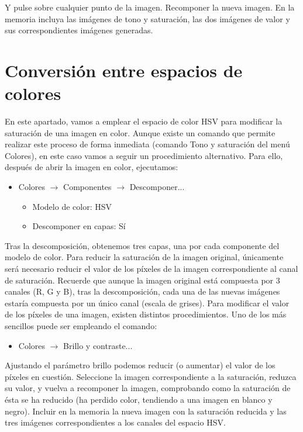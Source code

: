 \documentclass[es,practica]{uah}
\begin{document}
Y pulse sobre cualquier punto de la imagen. Recomponer la nueva imagen. En la memoria incluya las imágenes de tono y saturación, las dos imágenes de valor y sus correspondientes imágenes generadas.

\section{Conversión entre espacios de colores}

En este apartado, vamos a emplear el espacio de color HSV para modificar la saturación de una imagen en color. Aunque existe un comando que permite realizar este proceso de forma inmediata (comando Tono y saturación del menú Colores), en este caso vamos a seguir un procedimiento alternativo. Para ello, después de abrir la imagen en color, ejecutamos:
\begin{itemize}
	\item Colores $\rightarrow$ Componentes $\rightarrow$ Descomponer...
	\begin{itemize}
		\item Modelo de color: HSV
		\item Descomponer en capas: Sí
	\end{itemize}
\end{itemize}

Tras la descomposición, obtenemos tres capas, una por cada componente del modelo de color. Para reducir la saturación de la imagen original, únicamente será necesario reducir el valor de los píxeles de la imagen correspondiente al canal de saturación. Recuerde que aunque la imagen original está compuesta por 3 canales (R, G y B), tras la descomposición, cada una de las nuevas imágenes estaría compuesta por un único canal (escala de grises). Para modificar el valor de los píxeles de una imagen, existen distintos procedimientos. Uno de los más sencillos puede ser empleando el comando:
\begin{itemize}
	\item Colores $\rightarrow$ Brillo y contraste...
\end{itemize}

Ajustando el parámetro brillo podemos reducir (o aumentar) el valor de los píxeles en cuestión. Seleccione la imagen correspondiente a la saturación, reduzca su valor, y vuelva a recomponer la imagen, comprobando como la saturación de ésta se ha reducido (ha perdido color, tendiendo a una imagen en blanco y negro). Incluir en la memoria la nueva imagen con la saturación reducida y las tres imágenes correspondientes a los canales del espacio HSV.
\end{document}
